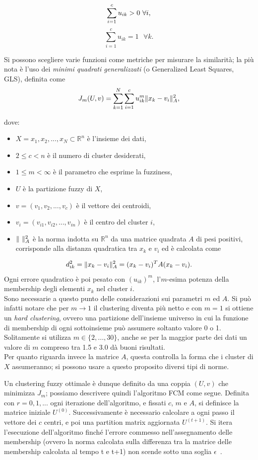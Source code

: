 \documentclass[oneside, openany]{book}
\DeclarePairedDelimiter{\norma}{\lVert}{\rVert}
\begin{document}
		\[
		\sum_{i=1}^{c}u_{ik} > 0\text{ } \forall i\text{,}\\
		\]
		\[
		\sum_{i=1}^{c}u_{ik} = 1 \text{ }\forall k\text{.}
		\]
		
		Si possono scegliere varie funzioni come metriche per misurare la similarità; la più nota è l'uso dei \textit{minimi quadrati generalizzati} (o Generalized Least Squares, GLS), definita come
		\[
			J_m(U, v)=\sum_{k=1}^{N}\sum_{i=1}^{c}u_{ik}^m\norma{x_k-v_i}^2_A\text{,}
		\]
		
		dove:
		\begin{itemize}
			\item $X = {x_1, x_2, ..., x_N} \subset \mathbb{R}^n$ è l'insieme dei dati, 
			\item $2 \leq c < n$ è il numero di cluster desiderati,
			\item $1 \leq m <\infty$ è il parametro che esprime la fuzziness,
			\item $U$ è la partizione fuzzy di $X$,
			\item $v = (v_1, v_2, ..., v_c)$ è il vettore dei centroidi,
			\item $v_i = (v_{i1}, v_{i2}, ..., v_{in})$ è il centro del cluster $i$,
			\item $\norma{\textit{ }}^2_A$ è la norma indotta su $\mathbb{R}^n$ da una matrice quadrata $A$ di pesi positivi, corrisponde alla distanza quadratica tra $x_k$ e $v_i$ ed è calcolata come
		\end{itemize}
		\[
			d^2_{ik} = \norma{x_k-v_i}^2_A = (x_k-v_i)^TA(x_k-v_i)\text{.}
		\] 	
		Ogni errore quadratico è poi pesato con $(u_{ik})^m$, l'$m$-esima potenza della membership degli elementi $x_k$ nel cluster $i$.\\
		Sono necessarie a questo punto delle considerazioni sui parametri $m$ ed $A$. Si può infatti notare che per $m\rightarrow 1$ il clustering diventa più netto e con $m=1$ si ottiene un \textit{hard clustering}, ovvero una partizione dell'insieme universo in cui la funzione di membership di ogni sottoinsieme può assumere soltanto valore 0 o 1. Solitamente si utilizza $m \in\{2,...,30\}$, anche se per la maggior parte dei dati un valore di $m$ compreso tra 1.5 e 3.0 dà buoni risultati. \\
		Per quanto riguarda invece la matrice $A$, questa controlla la forma che i cluster di $X$ assumeranno; si possono usare a questo proposito diversi tipi di norme.
		
		Un clustering fuzzy ottimale è dunque definito da una coppia $(U, v)$ che minimizza $J_m$; possiamo descrivere quindi l'algoritmo FCM come segue.
		Definita con $r=0,1, ...$ ogni iterazione dell'algoritmo, e fissati $c$, $m$ e $A$, si definisce la matrice iniziale $U^{(0)}$. Successivamente è necessario calcolare a ogni passo il vettore dei $c$ centri, e poi una partition matrix aggiornata $U^{(t+1)}$. Si itera l'esecuzione dell'algoritmo finché l'errore commesso nell'assegnamento delle membership (ovvero la norma calcolata sulla differenza tra la matrice delle membership calcolata al tempo t e t+1) non scende sotto una soglia $\epsilon$~\cite{bib:fcm}.
		
\end{document}
